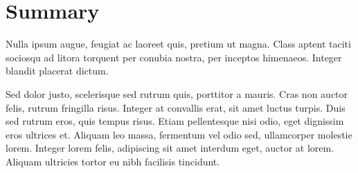 \section{Summary}
Nulla ipsum augue, feugiat ac laoreet quis, pretium ut magna. Class aptent taciti sociosqu ad litora torquent per conubia nostra, per inceptos himenaeos. Integer blandit placerat dictum.

Sed dolor justo, scelerisque sed rutrum quis, porttitor a mauris. Cras non auctor felis, rutrum fringilla risus. Integer at convallis erat, sit amet luctus turpis. Duis sed rutrum eros, quis tempus risus. Etiam pellentesque nisi odio, eget dignissim eros ultrices et. Aliquam leo massa, fermentum vel odio sed, ullamcorper molestie lorem. Integer lorem felis, adipiscing sit amet interdum eget, auctor at lorem. Aliquam ultricies tortor eu nibh facilisis tincidunt.